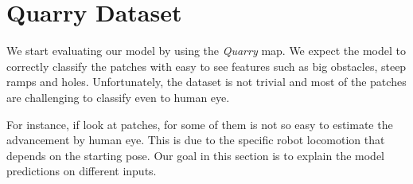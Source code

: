 
\section{Quarry Dataset}
We start evaluating our model by using the \emph{Quarry} map. We expect the model to correctly classify the patches with easy to see features such as big obstacles, steep ramps and holes. Unfortunately, the dataset is not trivial and most of the patches are challenging to classify even to human eye. 

For instance, if look at patches, for some of them is not so easy to estimate the advancement by human eye. This is due to the specific robot locomotion that depends on the starting pose. Our goal in this section is to explain the model predictions on different inputs. 

